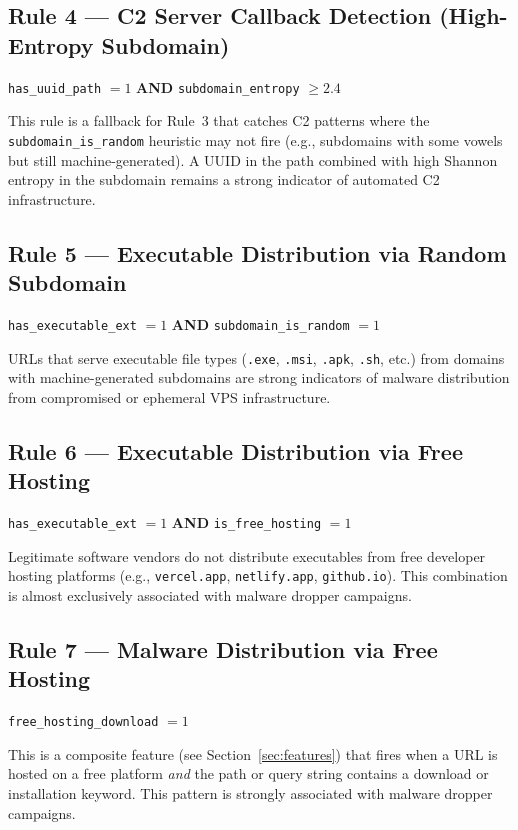 \documentclass[12pt,a4paper]{article}
\begin{document}
\subsection{Rule 4 --- C2 Server Callback Detection (High-Entropy Subdomain)}
\begin{center}
\texttt{has\_uuid\_path} $= 1$ \quad \textbf{AND} \quad \texttt{subdomain\_entropy} $\geq 2.4$
\end{center}
\noindent This rule is a fallback for Rule~3 that catches C2 patterns where the \texttt{subdomain\_is\_random} heuristic may not fire (e.g., subdomains with some vowels but still machine-generated). A UUID in the path combined with high Shannon entropy in the subdomain remains a strong indicator of automated C2 infrastructure.

\subsection{Rule 5 --- Executable Distribution via Random Subdomain}
\begin{center}
\texttt{has\_executable\_ext} $= 1$ \quad \textbf{AND} \quad \texttt{subdomain\_is\_random} $= 1$
\end{center}
\noindent URLs that serve executable file types (\texttt{.exe}, \texttt{.msi}, \texttt{.apk}, \texttt{.sh}, etc.) from domains with machine-generated subdomains are strong indicators of malware distribution from compromised or ephemeral VPS infrastructure.

\subsection{Rule 6 --- Executable Distribution via Free Hosting}
\begin{center}
\texttt{has\_executable\_ext} $= 1$ \quad \textbf{AND} \quad \texttt{is\_free\_hosting} $= 1$
\end{center}
\noindent Legitimate software vendors do not distribute executables from free developer hosting platforms (e.g., \texttt{vercel.app}, \texttt{netlify.app}, \texttt{github.io}). This combination is almost exclusively associated with malware dropper campaigns.

\subsection{Rule 7 --- Malware Distribution via Free Hosting}
\begin{center}
\texttt{free\_hosting\_download} $= 1$
\end{center}
\noindent This is a composite feature (see Section~\ref{sec:features}) that fires when a URL is hosted on a free platform \textit{and} the path or query string contains a download or installation keyword. This pattern is strongly associated with malware dropper campaigns.
\end{document}
